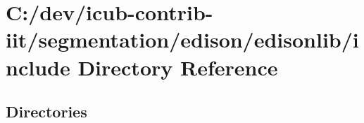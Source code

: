\section{C\+:/dev/icub-\/contrib-\/iit/segmentation/edison/edisonlib/include Directory Reference}
\label{dir_c91dd627cccebad60d99be50abf6398f}
\subsection*{Directories}
\begin{DoxyCompactItemize}
\end{DoxyCompactItemize}
